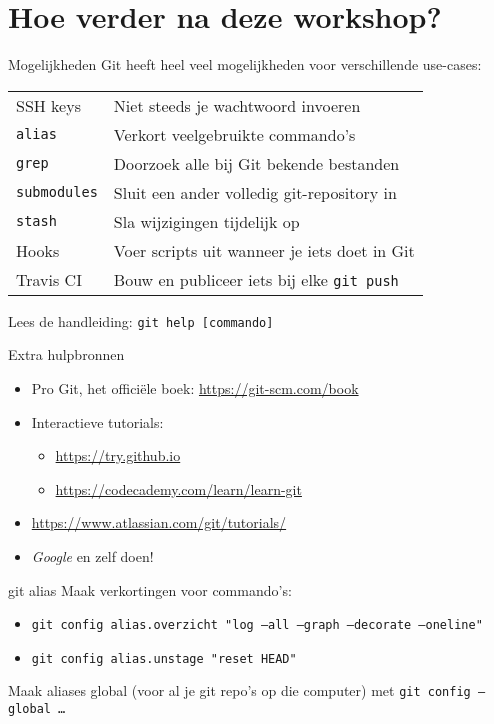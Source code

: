 \section[Hoe verder?]{Hoe verder na deze workshop?}

\begin{frame}{Mogelijkheden}
	Git heeft heel veel mogelijkheden voor verschillende use-cases:
	\begin{center}
		\begin{tabular}{ll}
			SSH keys		& Niet steeds je wachtwoord invoeren \\
			\texttt{alias} & Verkort veelgebruikte commando's \\
			\texttt{grep}	& Doorzoek alle bij Git bekende bestanden \\
			\texttt{submodules} & Sluit een ander volledig git-repository in \\
			\texttt{stash} & Sla wijzigingen tijdelijk op\\
			Hooks & Voer scripts uit wanneer je iets doet in Git \\
			Travis CI & Bouw en publiceer iets bij elke \texttt{git push}
		\end{tabular}
	\end{center}
	Lees de handleiding: \texttt{git help [commando]}
\end{frame}

\begin{frame}{Extra hulpbronnen}
	\begin{itemize}
		\item Pro Git, het offici\"ele boek: \url{https://git-scm.com/book}
		\item Interactieve tutorials:
			\begin{itemize}
				\item \url{https://try.github.io}
				\item \url{https://codecademy.com/learn/learn-git}
			\end{itemize}
		\item \url{https://www.atlassian.com/git/tutorials/}
		\item \emph{Google} en zelf doen!
	\end{itemize}
\end{frame}

\begin{frame}{git alias}
	Maak verkortingen voor commando's:
	\begin{itemize}
		\item \texttt{git config alias.overzicht "log --all --graph --decorate --oneline"}
		\item \texttt{git config alias.unstage "reset HEAD"}
	\end{itemize}
	Maak aliases global (voor al je git repo's op die computer) met \texttt{git config --global \ldots}
\end{frame}

